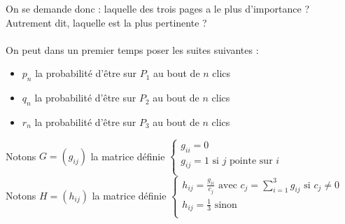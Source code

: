 \documentclass[a4paper,10pt]{report}
\begin{document}
On se demande donc : laquelle des trois pages a le plus d'importance ? Autrement dit, laquelle est la plus pertinente ?\\ \\

\indent On peut dans un premier temps poser les suites suivantes :
\begin{itemize}
\item $p_n$ la probabilité d'être sur $P_1$ au bout de $n$ clics
\item $q_n$ la probabilité d'être sur $P_2$ au bout de $n$ clics
\item $r_n$ la probabilité d'être sur $P_3$ au bout de $n$ clics
\end{itemize}
Notons $G=(g_{ij})$ la matrice définie
$\left\lbrace
\begin{array}{l}
g_{ii}=0  \\
g_{ij}=1 \text{ si } j \text{ pointe sur } i \\
\end{array}\right. $\\
Notons $H=(h_{ij})$ la matrice définie
$\left\lbrace
\begin{array}{l}
h_{ij}= \frac{g_{ii}}{c_j} \text{ avec } c_j=\sum^3_{i=1} g_{ij} \text{ si } c_j \ne 0 \\
h_{ij}= \frac{1}{3} \text{ sinon} \\
\end{array}\right. $ \\ \\
\end{document}
